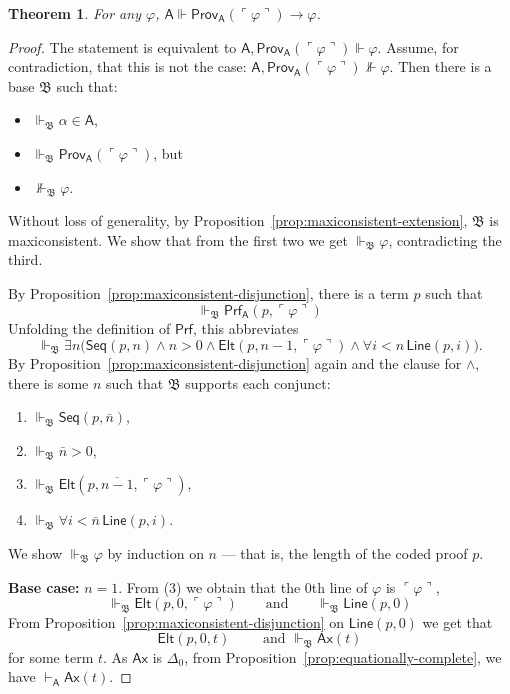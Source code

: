 \documentclass[reqno]{asl}
\newtheorem{theorem}[definition]{Theorem}
\newcommand{\supp}{\Vdash}
\newcommand{\base}[1]{\mathfrak{#1}}
\newcommand{\pa}{\textsf{A}}
\newcommand{\Prf}{\textsf{Prf}}
\newcommand{\Line}{\textsf{Line}}
\newcommand{\Ax}{\textsf{Ax}}
\newcommand{\Seq}{\textsf{Seq}}
\newcommand{\Prov}{\textsf{Prov}}
\newcommand{\Elt}{\textsf{Elt}}
\begin{document}
\begin{theorem}\label{thm:reflection}
    For any $\varphi$, $\pa \supp \Prov_{\pa}(\ulcorner \varphi \urcorner) \to \varphi$.
\end{theorem}
\begin{proof}
    The statement is equivalent to $\pa, \Prov_{\pa}(\ulcorner \varphi \urcorner) \supp \varphi$. Assume, for contradiction, that this is not the case: $\pa, \Prov_{\pa}(\ulcorner \varphi \urcorner) \not \supp \varphi$. Then there is a base $\base{B}$ such that:
    \begin{itemize}
        \item $\supp_{\base{B}} \alpha \in \pa$,
        \item $\supp_{\base{B}}  \Prov_{\pa}(\ulcorner \varphi \urcorner)$, but
        \item $\not \supp_{\base{B}} \varphi$.
    \end{itemize}
    Without loss of generality, by Proposition~\ref{prop:maxiconsistent-extension}, $\base{B}$ is maxiconsistent. We show that from the first two we get $\supp_{\base{B}} \varphi$, contradicting the third. \medskip

By Proposition~\ref{prop:maxiconsistent-disjunction}, there is a term $p$ such that 
\[
\supp_{\base{B}}  \Prf_{\pa}(p,\ulcorner \varphi \urcorner)
\]
Unfolding the definition of $\Prf$,
this abbreviates
\[
\supp_{\base{B}}\exists n\Big(
\Seq(p,n)\wedge n>0 \wedge \Elt(p,n-1,\ulcorner\varphi\urcorner)\wedge \forall i<n\,\Line(p,i)
\Big).
\]
By Proposition~\ref{prop:maxiconsistent-disjunction} again and the clause for $\land$, there is some $n$ such that
$\base{B}$ supports each conjunct:
\begin{enumerate}
\item $\supp_{\base{B}}\Seq(p,\bar n)$,
\item $\supp_{\base{B}}\bar n>0$,
\item $\supp_{\base{B}}\Elt(p,\overline{n-1},\ulcorner\varphi\urcorner)$,
\item $\supp_{\base{B}}\forall i<\bar n\,\Line(p,i)$.
\end{enumerate}

We show $\supp_{\base{B}}\varphi$ by induction on $n$ --- that is, the length of the coded proof $p$.

\smallskip
\noindent\textbf{Base case:} $n=1$. From (3) we obtain that the $0$th line of $\varphi$ is $\ulcorner \varphi \urcorner$,
\[
\supp_{\base{B}} \Elt(p,0,\ulcorner\varphi\urcorner) \qquad \text{and} \qquad \supp_{\base{B}} \Line(p,0)
\]
From Proposition~\ref{prop:maxiconsistent-disjunction} on $\Line(p,0)$ we get that 
\[
\Elt(p,0,t) \qquad \text{ and } \supp_{\base{B}} \Ax(t)
\]
for some term $t$. As $\Ax$ is $\Delta_0$, from Proposition~\ref{prop:equationally-complete}, we have $\vdash_{\pa} \Ax(t)$. 


\end{proof}
\end{document}
